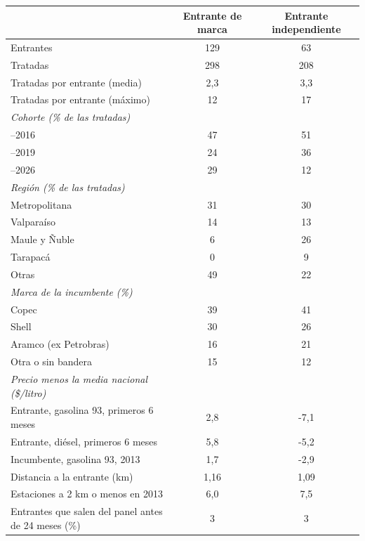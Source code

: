 \begin{tabular}{lcc}
\toprule
 & Entrante de marca & Entrante independiente \\
\midrule
Entrantes & 129 & 63 \\
Tratadas & 298 & 208 \\
Tratadas por entrante (media) & 2{,}3 & 3{,}3 \\
Tratadas por entrante (máximo) & 12 & 17 \\
\addlinespace\emph{Cohorte (\% de las tratadas)} & & \\ \quad 2014--2016 & 47 & 51 \\
\quad 2017--2019 & 24 & 36 \\
\quad 2020--2026 & 29 & 12 \\
\addlinespace\emph{Región (\% de las tratadas)} & & \\ \quad Metropolitana & 31 & 30 \\
\quad Valparaíso & 14 & 13 \\
\quad Maule y Ñuble & 6 & 26 \\
\quad Tarapacá & 0 & 9 \\
\quad Otras & 49 & 22 \\
\addlinespace\emph{Marca de la incumbente (\%)} & & \\ \quad Copec & 39 & 41 \\
\quad Shell & 30 & 26 \\
\quad Aramco (ex Petrobras) & 16 & 21 \\
\quad Otra o sin bandera & 15 & 12 \\
\addlinespace\emph{Precio menos la media nacional (\$/litro)} & & \\ \quad Entrante, gasolina 93, primeros 6 meses & 2{,}8 & -7{,}1 \\
\quad Entrante, diésel, primeros 6 meses & 5{,}8 & -5{,}2 \\
\quad Incumbente, gasolina 93, 2013 & 1{,}7 & -2{,}9 \\
\addlinespace Distancia a la entrante (km) & 1{,}16 & 1{,}09 \\
Estaciones a 2 km o menos en 2013 & 6{,}0 & 7{,}5 \\
Entrantes que salen del panel antes de 24 meses (\%) & 3 & 3 \\
\bottomrule
\end{tabular}
